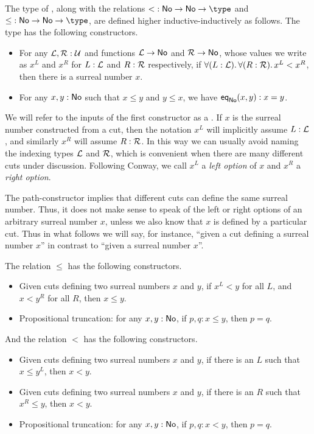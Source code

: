 \begin{defn}\label{defn:surreals}
  The type \NO of ,
  along with the relations $\mathord<:\NO\to\NO\to\type$ and $\mathord\le:\NO\to\NO\to\type$, are defined higher inductive-inductively as follows.
  The type \NO has the following constructors.
  \begin{itemize}
  \item For any $\mathcal{L},\mathcal{R}:\mathcal{U}$ and functions $\mathcal{L}\to \mathsf{No}$ and $\mathcal{R}\to \mathsf{No}$, whose values we write as $x^L$ and $x^R$ for $L:\mathcal{L}$ and $R:\mathcal{R}$ respectively, if $\fall{L:\LL}{R:\RR} x^L<x^R$, then there is a surreal number $x$.
  \item For any $x,y:\mathsf{No}$ such that $x\le y$ and $y\le x$, we have $\mathsf{eq}_{\mathsf{No}}(x,y):x=y$.
  \end{itemize}
  We will refer to the inputs of the first constructor as a .
  If $x$ is the surreal number constructed from a cut, then the notation $x^L$ will implicitly assume $L:\mathcal{L}$, and similarly $x^R$ will assume $R:\mathcal{R}$.
  In this way we can usually avoid naming the indexing types $\mathcal{L}$ and $\mathcal{R}$, which is convenient when there are many different cuts under discussion.
  Following Conway, we call $x^L$ a \emph{left option} of $x$ and $x^R$ a \emph{right option}.

  The path-constructor implies that different cuts can define the same surreal number.
  Thus, it does not make sense to speak of the left or right options of an arbitrary surreal number $x$, unless we also know that $x$ is defined by a particular cut.
  Thus in what follows we will say, for instance, ``given a cut defining a surreal number $x$'' in contrast to ``given a surreal number $x$''.

  The relation $\le$ has the following constructors.
  \begin{itemize}
  \item Given cuts defining two surreal numbers $x$ and $y$, if $x^L<y$ for all $L$, and $x<y^R$ for all $R$, then $x\le y$.
  \item Propositional truncation:
    for any $x,y:\mathsf{No}$, if $p,q:x\le y$, then $p=q$.
  \end{itemize}
  And the relation $<$ has the following constructors.
  \begin{itemize}
  \item Given cuts defining two surreal numbers $x$ and $y$, if there is an $L$ such that $x\le y^L$, then $x<y$.
  \item Given cuts defining two surreal numbers $x$ and $y$, if there is an $R$ such that $x^R\le y$, then $x<y$.
  \item Propositional truncation: for any $x,y:\mathsf{No}$, if $p,q:x<y$, then $p=q$.
  \end{itemize}
\end{defn}

